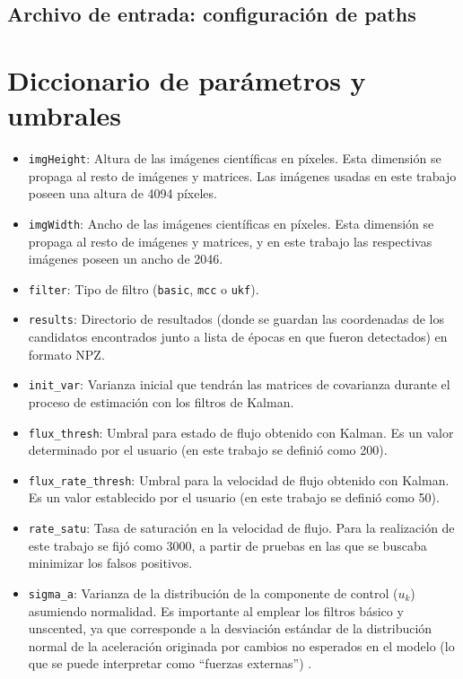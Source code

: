 \begin{appendix}
\subsection{Archivo de entrada: configuraci\'on de paths}
\label{subs:a1}

\pagebreak
\section{Diccionario de par\'ametros y umbrales}
\label{subs:a3}

\begin{itemize}
\item \texttt{imgHeight}: Altura de las im\'agenes cient\'ificas en p\'ixeles. Esta dimensi\'on se propaga al resto de im\'agenes y matrices. Las im\'agenes usadas en este trabajo poseen una altura de 4094 p\'ixeles. 
\item \texttt{imgWidth}: Ancho de las im\'agenes cient\'ificas en p\'ixeles. Esta dimensi\'on se propaga al resto de im\'agenes y matrices, y en este trabajo las respectivas im\'agenes poseen un ancho de 2046.
\item \texttt{filter}: Tipo de filtro (\texttt{basic}, \texttt{mcc} o \texttt{ukf}).
\item \texttt{results}: Directorio de resultados (donde se guardan las coordenadas de los candidatos encontrados junto a lista de \'epocas en que fueron detectados) en formato NPZ.
\item \texttt{init\_var}: Varianza inicial que tendr\'an las matrices de covarianza durante el proceso de estimaci\'on con los filtros de Kalman. 
\item \texttt{flux\_thresh}: Umbral para estado de flujo obtenido con Kalman. Es un valor determinado por el usuario (en este trabajo se defini\'o como 200). 
\item \texttt{flux\_rate\_thresh}: Umbral para la velocidad de flujo obtenido con Kalman. Es un valor establecido por el usuario (en este trabajo se defini\'o como 50).
\item \texttt{rate\_satu}: Tasa de saturaci\'on en la velocidad de flujo. Para la realizaci\'on de este trabajo se fij\'o como 3000, a partir de pruebas en las que se buscaba minimizar los falsos positivos.
\item \texttt{sigma\_a}: Varianza de la distribuci\'on de la componente de control ($u_k$) asumiendo normalidad. Es importante al emplear los filtros b\'asico y unscented, ya que corresponde a la desviaci\'on est\'andar de la distribuci\'on normal de la aceleraci\'on originada por cambios no esperados en el modelo (lo que se puede interpretar como ``fuerzas externas'') \cite{ian}.

\end{itemize}
\end{appendix}
